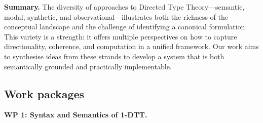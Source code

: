 \documentclass[a4paper,11pt]{article}
\renewcommand{\paragraph}[1]{\textbf{#1.}}
\begin{document}
\paragraph{Summary}
The diversity of approaches to Directed Type Theory—semantic, modal,
synthetic, and observational—illustrates both the richness of the
conceptual landscape and the challenge of identifying a canonical
formulation. This variety is a strength: it offers multiple
perspectives on how to capture directionality, coherence, and
computation in a unified framework. Our work aims to synthesise ideas
from these strands to develop a system that is both semantically
grounded and practically implementable.

\subsection{Work packages}\label{work-packages}




\paragraph{WP 1: Syntax and Semantics of 1-DTT}
\end{document}
